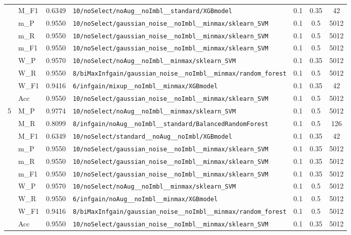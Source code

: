 \begin{table}[htbp]
\begin{tabular}{|c|l|c|>{\ttfamily\footnotesize}p{7.2cm}|c|c|c|}
 & M\_F1 & 0.6349 & \texttt{10/noSelect/noAug\_\_noImbl\_\_standard/XGBmodel} & 0.1 & 0.35  & 42 \\ 
 & m\_P & 0.9550 & \texttt{10/noSelect/gaussian\_noise\_\_noImbl\_\_minmax/sklearn\_SVM} & 0.1 & 0.5  & 5012 \\ 
 & m\_R & 0.9550 & \texttt{10/noSelect/gaussian\_noise\_\_noImbl\_\_minmax/sklearn\_SVM} & 0.1 & 0.5  & 5012 \\ 
 & m\_F1 & 0.9550 & \texttt{10/noSelect/gaussian\_noise\_\_noImbl\_\_minmax/sklearn\_SVM} & 0.1 & 0.5  & 5012 \\ 
 & W\_P & 0.9570 & \texttt{10/noSelect/noAug\_\_noImbl\_\_minmax/sklearn\_SVM} & 0.1 & 0.35  & 5012 \\ 
 & W\_R & 0.9550 & \texttt{8/biMaxInfgain/gaussian\_noise\_\_noImbl\_\_minmax/random\_forest} & 0.1 & 0.5  & 5012 \\ 
 & W\_F1 & 0.9416 & \texttt{6/infgain/mixup\_\_noImbl\_\_minmax/XGBmodel} & 0.1 & 0.35  & 42 \\ 
 & Acc & 0.9550 & \texttt{10/noSelect/gaussian\_noise\_\_noImbl\_\_minmax/sklearn\_SVM} & 0.1 & 0.5  & 5012 \\ 
\hline
\multirow{10}{*}{5} & M\_P & 0.9774 & \texttt{10/noSelect/noAug\_\_noImbl\_\_minmax/sklearn\_SVM} & 0.1 & 0.5  & 5012 \\ 
 & M\_R & 0.8099 & \texttt{8/infgain/noAug\_\_noImbl\_\_standard/BalancedRandomForest} & 0.1 & 0.5  & 126 \\ 
 & M\_F1 & 0.6349 & \texttt{10/noSelect/standard\_\_noAug\_\_noImbl/XGBmodel} & 0.1 & 0.35  & 42 \\ 
 & m\_P & 0.9550 & \texttt{10/noSelect/gaussian\_noise\_\_noImbl\_\_minmax/sklearn\_SVM} & 0.1 & 0.35  & 5012 \\ 
 & m\_R & 0.9550 & \texttt{10/noSelect/gaussian\_noise\_\_noImbl\_\_minmax/sklearn\_SVM} & 0.1 & 0.35  & 5012 \\ 
 & m\_F1 & 0.9550 & \texttt{10/noSelect/gaussian\_noise\_\_noImbl\_\_minmax/sklearn\_SVM} & 0.1 & 0.35  & 5012 \\ 
 & W\_P & 0.9570 & \texttt{10/noSelect/noAug\_\_noImbl\_\_minmax/sklearn\_SVM} & 0.1 & 0.5  & 5012 \\ 
 & W\_R & 0.9550 & \texttt{6/infgain/noAug\_\_noImbl\_\_minmax/XGBmodel} & 0.1 & 0.5  & 5012 \\ 
 & W\_F1 & 0.9416 & \texttt{8/biMaxInfgain/gaussian\_noise\_\_noImbl\_\_minmax/random\_forest} & 0.1 & 0.5  & 5012 \\ 
 & Acc & 0.9550 & \texttt{10/noSelect/gaussian\_noise\_\_noImbl\_\_minmax/sklearn\_SVM} & 0.1 & 0.35  & 5012 \\ 
\hline
\end{tabular}
\end{table}